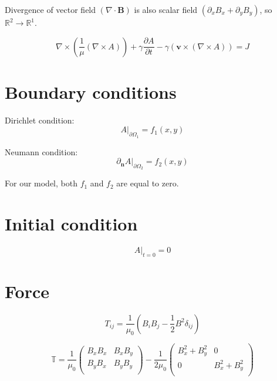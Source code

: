 Divergence of vector field $\left(\nabla \cdot \bm{B}\right)$ is also scalar field $\left(\partial_x B_x + \partial_y B_y\right)$, so $\mathbb{R}^2 \rightarrow \mathbb{R}^1$.

\begin{equation} \label{eq:7}
\nabla \times \left( \frac{1}{\mu} \left( \nabla \times A \right) \right) + \gamma \frac{\partial A}{\partial t} - \gamma \left( \bm{v} \times \left( \nabla \times A \right) \right) = J
\end{equation}

\section{Boundary conditions}
\noindent Dirichlet condition:
\begin{equation} \label{eq:8} 
A\bigg\rvert_{\partial \Omega_1} = f_1\left(x,y\right)
\end{equation}

\noindent Neumann condition:
\begin{equation} \label{eq:9} 
\partial_{\bm{n}} A\bigg\rvert_{\partial \Omega_2} = f_2\left(x,y\right)
\end{equation}

\noindent For our model, both $f_1$ and $f_2$ are equal to zero.

\section{Initial condition}

\begin{equation} \label{eq:10} 
A\bigg\rvert_{t=0} = 0
\end{equation}

\section{Force}

\begin{equation} \label{eq:11} 
T_{ij} = \frac{1}{\mu_0} \left(B_i B_j - \frac{1}{2} B^2 \delta_{ij}\right)
\end{equation}

\begin{equation} \label{eq:12} 
\mathbb{T} = \frac{1}{\mu_0} \begin{pmatrix}
B_x B_x & B_x B_y \\
B_y B_x & B_y B_y \\
\end{pmatrix} - \frac{1}{2\mu_0} \begin{pmatrix}
B_x^2 + B_y^2 & 0 \\
0 & B_x^2 + B_y^2 \\
\end{pmatrix}
\end{equation}

